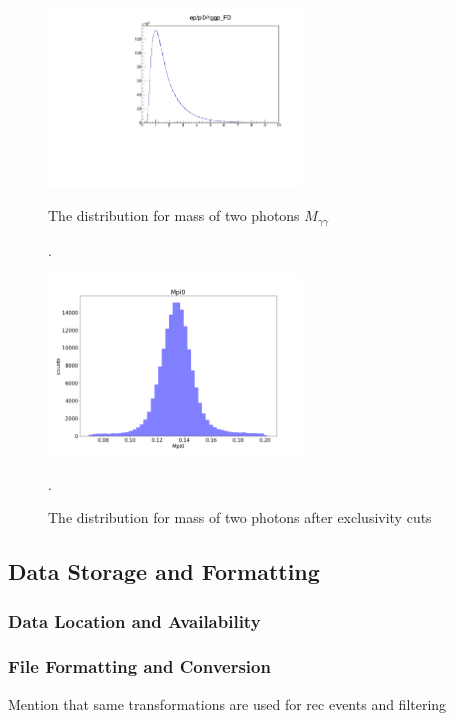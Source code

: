 \begin{figure}[hbt]
	\centering
	\includegraphics[page=6,width=0.6\textwidth]{Chapters/Ch2-Experiment/recon_pid/pid_figs/eppi0.exclusive.pdf}
	
	\caption{The distribution for mass of two photons $M_{\gamma\gamma}$}.
	\label{fig:ggmass}
	
	\centering
	\includegraphics[width=0.6\textwidth]{Chapters/Ch2-Experiment/recon_pid/pid_figs/Mpi0.png}
	
	\caption{The distribution for mass of two photons after exclusivity cuts}.
	\label{fig:ggmass_after}
	
\end{figure}




\subsection{Data Storage and Formatting}
    \subsubsection{Data Location and Availability}
    \subsubsection{File Formatting and Conversion}\label{sec:filtering}
        Mention that same transformations are used for rec events and filtering
    
